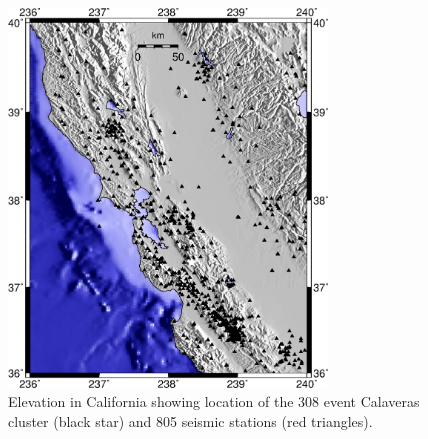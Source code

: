 \documentclass[draft,jgrga]{agutex}
\begin{document}
\begin{figure}
\noindent\includegraphics[width = 20pc]{diags/CalaverasMap/gmt_california/CaliforniaCalaverasMap1.eps}
\caption{Elevation in California showing location
of the 308 event Calaveras cluster (black star) and 805 seismic stations (red triangles).}
\label{fig:-eqopti-California-Calaveras}
\end{figure}
\end{document}
